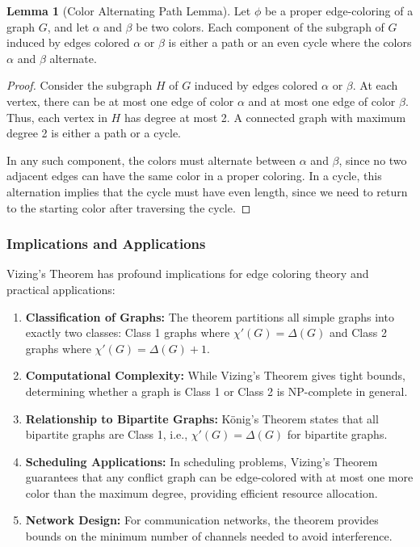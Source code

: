 \documentclass{article}
\theoremstyle{definition}
\newtheorem{lemma}{Lemma}
\begin{document}
\begin{lemma}[Color Alternating Path Lemma]
Let $\phi$ be a proper edge-coloring of a graph $G$, and let $\alpha$ and $\beta$ be two colors. Each component of the subgraph of $G$ induced by edges colored $\alpha$ or $\beta$ is either a path or an even cycle where the colors $\alpha$ and $\beta$ alternate.
\end{lemma}

\begin{proof}
Consider the subgraph $H$ of $G$ induced by edges colored $\alpha$ or $\beta$. At each vertex, there can be at most one edge of color $\alpha$ and at most one edge of color $\beta$. Thus, each vertex in $H$ has degree at most 2. A connected graph with maximum degree 2 is either a path or a cycle. 

In any such component, the colors must alternate between $\alpha$ and $\beta$, since no two adjacent edges can have the same color in a proper coloring. In a cycle, this alternation implies that the cycle must have even length, since we need to return to the starting color after traversing the cycle.
\end{proof}

\subsubsection{Implications and Applications}

Vizing's Theorem has profound implications for edge coloring theory and practical applications:

\begin{enumerate}
\item \textbf{Classification of Graphs:} The theorem partitions all simple graphs into exactly two classes: Class 1 graphs where $\chi'(G) = \Delta(G)$ and Class 2 graphs where $\chi'(G) = \Delta(G) + 1$.

\item \textbf{Computational Complexity:} While Vizing's Theorem gives tight bounds, determining whether a graph is Class 1 or Class 2 is NP-complete in general.

\item \textbf{Relationship to Bipartite Graphs:} König's Theorem states that all bipartite graphs are Class 1, i.e., $\chi'(G) = \Delta(G)$ for bipartite graphs.

\item \textbf{Scheduling Applications:} In scheduling problems, Vizing's Theorem guarantees that any conflict graph can be edge-colored with at most one more color than the maximum degree, providing efficient resource allocation.

\item \textbf{Network Design:} For communication networks, the theorem provides bounds on the minimum number of channels needed to avoid interference.
\end{enumerate}
\end{document}

